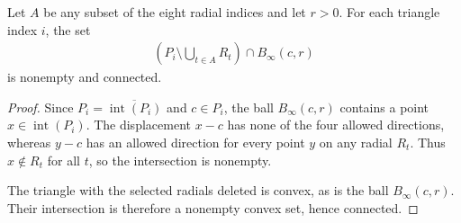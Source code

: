 \begin{lemma}
    \label{thm:area_law_fan_cut_piece_connected}
    \leanok
    Let $A$ be any subset of the eight radial indices and let $r>0$.
    For each triangle index $i$, the set
    \begin{align}
        \left(P_i\setminus\bigcup_{t\in A}R_t\right)\cap B_\infty(c,r)
    \end{align}
    is nonempty and connected.
\end{lemma}
\begin{proof}\leanok
    Since $P_i=\overline{\operatorname{int}(P_i)}$ and $c\in P_i$, the ball
    $B_\infty(c,r)$ contains a point $x\in\operatorname{int}(P_i)$.
    The displacement $x-c$ has none of the four allowed directions, whereas
    $y-c$ has an allowed direction for every point $y$ on any radial $R_t$.
    Thus $x\notin R_t$ for all $t$, so the intersection is nonempty.

    The triangle with the selected radials deleted is convex, as is the ball
    $B_\infty(c,r)$. Their intersection is therefore a nonempty convex set,
    hence connected.
\end{proof}

